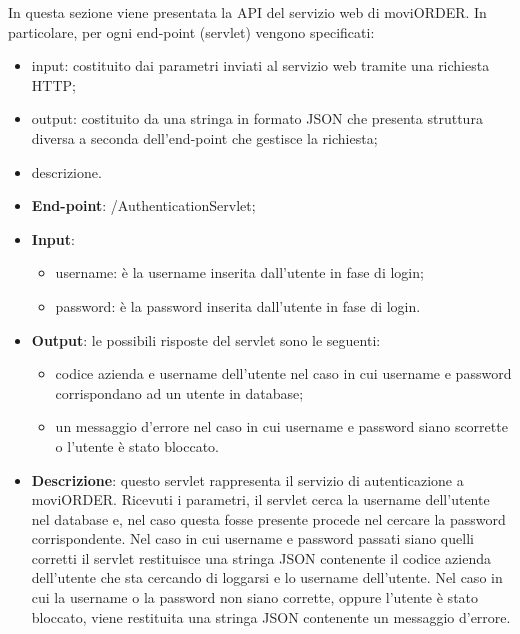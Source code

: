 In questa sezione viene presentata la API del servizio web di moviORDER. In particolare, per ogni end-point (servlet) vengono specificati:
\begin{itemize}
	\item input: costituito dai parametri inviati al servizio web tramite una richiesta HTTP;
	\item output: costituito da una stringa in formato JSON che presenta struttura diversa a seconda dell'end-point che gestisce la richiesta;
	\item descrizione.
\end{itemize}


\begin{itemize}
	\item \textbf{End-point}: /AuthenticationServlet;
	\item \textbf{Input}:
		\begin{itemize}
			\item username: è la username inserita dall'utente in fase di login;
			\item password: è la password inserita dall'utente in fase di login.
		\end{itemize}
	\item \textbf{Output}: le possibili risposte del servlet sono le seguenti:
		\begin{itemize}
			\item codice azienda e username dell'utente nel caso in cui username e password corrispondano ad un utente in database;
			\item un messaggio d'errore nel caso in cui username e password siano scorrette o l'utente è stato bloccato. 
		\end{itemize}
		\item \textbf{Descrizione}: questo servlet rappresenta il servizio di autenticazione a moviORDER. Ricevuti i parametri, il servlet cerca la username dell'utente nel database e, nel caso questa fosse presente procede nel cercare la password corrispondente. Nel caso in cui username e password passati siano quelli corretti il servlet restituisce una stringa JSON contenente il codice azienda dell'utente che sta cercando di loggarsi e lo username dell'utente. Nel caso in cui la username o la password non siano corrette, oppure l'utente è stato bloccato, viene restituita una stringa JSON contenente un messaggio d'errore.
\end{itemize}


